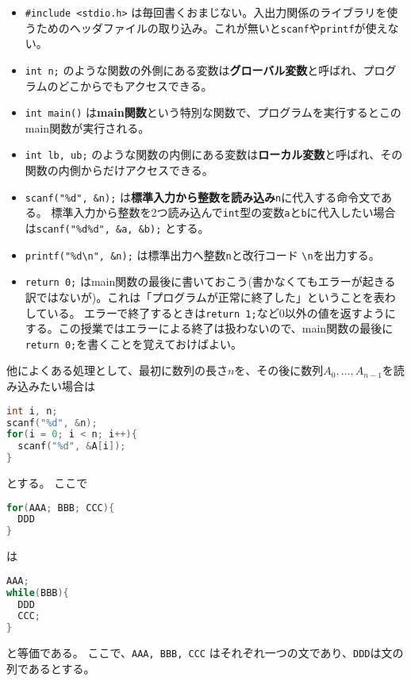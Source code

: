 \documentclass[a4paper,twoside,onecolumn,openany,article,10pt]{memoir}
\theoremstyle{remark}
\begin{document}
\begin{itemize}
\item \texttt{\#include <stdio.h>} は毎回書くおまじない。入出力関係のライブラリを使うためのヘッダファイルの取り込み。これが無いと\texttt{scanf}や\texttt{printf}が使えない。
\item \texttt{int n;} のような関数の外側にある変数は\textbf{グローバル変数}と呼ばれ、プログラムのどこからでもアクセスできる。
\item \texttt{int main()} は\textbf{main関数}という特別な関数で、プログラムを実行するとこのmain関数が実行される。
\item \texttt{int lb, ub;} のような関数の内側にある変数は\textbf{ローカル変数}と呼ばれ、その関数の内側からだけアクセスできる。
\item \texttt{scanf("\%d", \&n);} は\textbf{標準入力から整数を読み込み}\texttt{n}に代入する命令文である。
標準入力から整数を2つ読み込んで\texttt{int}型の変数\texttt{a}と\texttt{b}に代入したい場合は\texttt{scanf("\%d\%d", \&a, \&b);} とする。
\item \texttt{printf("\%d\textbackslash n", \&n);} は標準出力へ整数\texttt{n}と改行コード \texttt{\textbackslash n}を出力する。
\item \texttt{return 0;} はmain関数の最後に書いておこう(書かなくてもエラーが起きる訳ではないが)。これは「プログラムが正常に終了した」ということを表わしている。
エラーで終了するときは\texttt{return 1;}など0以外の値を返すようにする。この授業ではエラーによる終了は扱わないので、main関数の最後に\texttt{return 0;}を書くことを覚えておけばよい。
\end{itemize}
他によくある処理として、最初に数列の長さ$n$を、その後に数列$A_0,\dotsc,A_{n-1}$を読み込みたい場合は
\begin{lstlisting}[basicstyle=\ttfamily\normalsize,showstringspaces=false,language=C,frame=single]
int i, n;
scanf("%d", &n);
for(i = 0; i < n; i++){
  scanf("%d", &A[i]);
}
\end{lstlisting}
とする。
ここで
\begin{lstlisting}[basicstyle=\ttfamily\normalsize,showstringspaces=false,language=C,frame=single]
for(AAA; BBB; CCC){
  DDD
}
\end{lstlisting}
は
\begin{lstlisting}[basicstyle=\ttfamily\normalsize,showstringspaces=false,language=C,frame=single]
AAA;
while(BBB){
  DDD
  CCC;
}
\end{lstlisting}
と等価である。
ここで、\texttt{AAA, BBB, CCC} はそれぞれ一つの文であり、\texttt{DDD}は文の列であるとする。
\end{document}
